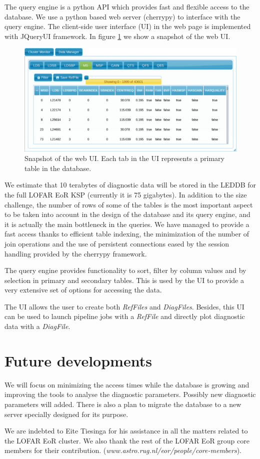 \documentclass[11pt,twoside]{article}
\begin{document}
The query engine is a python API which provides fast and flexible access to the database.
We use a python based web server (cherrypy) to interface with the query engine. The client-side user interface (UI) in the web page is implemented with JQueryUI framework. In figure \ref{fig:webui} we show a snapshot of the web UI.
\begin{figure}[!ht]
  \centering
    \includegraphics[scale=0.24]{O23_f3.eps} 
  \caption{Snapshot of the web UI. Each tab in the UI represents a primary table in the database.}
  \label{fig:webui}
\end{figure}

We estimate that 10 terabytes of diagnostic data will be stored in the LEDDB for the full LOFAR EoR KSP (currently it is 75 gigabytes). In addition to the size challenge, the number of rows of some of the tables is the most important aspect to be taken into account in the design of the database and its query engine, and it is actually the main bottleneck in the queries. We have managed to provide a fast access thanks to efficient table indexing, the minimization of the number of join operations and the use of persistent connections eased by the session handling provided by the cherrypy framework. 

The query engine provides functionality to sort, filter by column values and by selection in primary and secondary tables. This is used by the UI to provide a very extensive set of options for accessing the data.

The UI allows the user to create both \textit{RefFiles} and \textit{DiagFiles}. Besides, this UI can be used to launch pipeline jobs with a \textit{RefFile} and directly plot diagnostic data with a \textit{DiagFile}.

\section{Future developments}
We will focus on minimizing the access times while the database is growing and improving the tools to analyse the diagnostic parameters. Possibly new diagnostic parameters will added. There is also a plan to migrate the database to a new server specially designed for its purpose. 

\acknowledgements We are indebted to Eite Tiesinga for his assistance in all the matters related to the LOFAR EoR cluster. We also thank the rest of the LOFAR EoR group core members for their contribution. \newline (\textit{www.astro.rug.nl/eor/people/core-members}).


\end{document}
